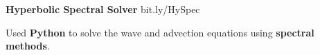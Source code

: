 \textbf{Hyperbolic Spectral Solver} \hfill bit.ly/HySpec

	\begin{items}
		\item Used \textbf{Python} to solve the wave and advection equations using \textbf{spectral methods}.
	\end{items}